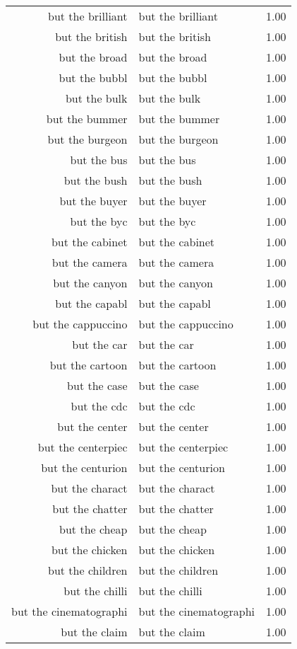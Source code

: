 \begin{table}[ht]
\begin{tabular}{rlr}
  but the brilliant & but the brilliant & 1.00 \\ 
  but the british & but the british & 1.00 \\ 
  but the broad & but the broad & 1.00 \\ 
  but the bubbl & but the bubbl & 1.00 \\ 
  but the bulk & but the bulk & 1.00 \\ 
  but the bummer & but the bummer & 1.00 \\ 
  but the burgeon & but the burgeon & 1.00 \\ 
  but the bus & but the bus & 1.00 \\ 
  but the bush & but the bush & 1.00 \\ 
  but the buyer & but the buyer & 1.00 \\ 
  but the byc & but the byc & 1.00 \\ 
  but the cabinet & but the cabinet & 1.00 \\ 
  but the camera & but the camera & 1.00 \\ 
  but the canyon & but the canyon & 1.00 \\ 
  but the capabl & but the capabl & 1.00 \\ 
  but the cappuccino & but the cappuccino & 1.00 \\ 
  but the car & but the car & 1.00 \\ 
  but the cartoon & but the cartoon & 1.00 \\ 
  but the case & but the case & 1.00 \\ 
  but the cdc & but the cdc & 1.00 \\ 
  but the center & but the center & 1.00 \\ 
  but the centerpiec & but the centerpiec & 1.00 \\ 
  but the centurion & but the centurion & 1.00 \\ 
  but the charact & but the charact & 1.00 \\ 
  but the chatter & but the chatter & 1.00 \\ 
  but the cheap & but the cheap & 1.00 \\ 
  but the chicken & but the chicken & 1.00 \\ 
  but the children & but the children & 1.00 \\ 
  but the chilli & but the chilli & 1.00 \\ 
  but the cinematographi & but the cinematographi & 1.00 \\ 
  but the claim & but the claim & 1.00 \\ 

\end{tabular}
\end{table}
